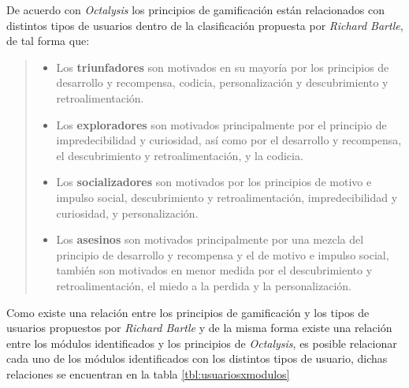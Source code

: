  \noindent
 De acuerdo con {\it Octalysis} \cite[p. 414]{Octalysis} los principios de
 gamificación están relacionados con distintos tipos de usuarios dentro de la
 clasificación propuesta por {\it Richard Bartle}, de tal forma que:

    \begin{quote}
    \begin{itemize}
        \item Los {\bf triunfadores} son motivados en su mayoría por
              los principios de desarrollo y recompensa, codicia,
              personalización y descubrimiento y retroalimentación.

        \item Los {\bf exploradores} son motivados principalmente por
              el principio de impredecibilidad y curiosidad, así como
              por el desarrollo y recompensa, el descubrimiento y
              retroalimentación, y la codicia.

        \item Los {\bf socializadores} son motivados por los principios
              de motivo e impulso social, descubrimiento y retroalimentación,
              impredecibilidad y curiosidad, y personalización.

        \item Los {\bf asesinos} son motivados principalmente por una mezcla
              del principio de desarrollo y recompensa y el de motivo e impulso
              social, también son motivados en menor medida por el descubrimiento
              y retroalimentación, el miedo a la perdida y la personalización.
    \end{itemize}
    \end{quote}

 \noindent 
 Como existe una relación entre los principios de gamificación y los tipos de usuarios
 propuestos por {\it Richard Bartle} y de la misma forma existe una relación entre
 los módulos identificados y los principios de {\it Octalysis}, es posible relacionar
 cada uno de los módulos identificados con los distintos tipos de usuario, dichas 
 relaciones se encuentran en la tabla \ref{tbl:usuariosxmodulos}

